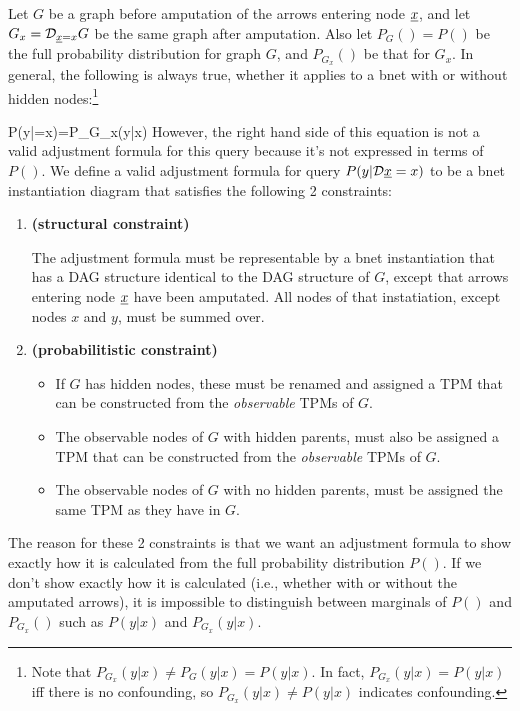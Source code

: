Let $G$ be a graph before
amputation
of the arrows entering node $\rvx$,
and let $G_x=\cald_{\rvx=x}G$
be the same graph after amputation.
Also let $P_G()=P()$ be
the full probability distribution
for graph $G$, and $P_{G_x}()$
be that for $G_x$.
In general, the
following is always true,
whether it applies to a bnet
with or without hidden nodes:\footnote{Note that $P_{G_x}(y|x)\neq P_G(y|x)=P(y|x)$.
In fact,
$P_{G_x}(y|x)= P(y|x)$
iff there is no confounding,
so $P_{G_x}(y|x)\neq P(y|x)$
indicates confounding.
}

\beq
P(y|\cald\rvx=x)=P_{G_x}(y|x)
\;
\eeq
However, the right hand side of this equation is
not a valid adjustment formula
for this query
because it's not expressed in terms
of $P()$.
We define a valid adjustment formula
for query
$P(y|\cald\rvx=x)$
to be a bnet instantiation diagram
that satisfies the
following 2 constraints:

\begin{enumerate}
\item {\bf(structural constraint)}

The adjustment formula must be
representable by a bnet instantiation
that has a DAG structure identical
to the DAG structure of $G$,
except that arrows entering node
$\rvx$ have been amputated.
All nodes  of that instatiation, except
nodes  $x$ and $y$,
must be summed over.

\item {\bf (probabilitistic constraint)}

\begin{itemize}
\item If $G$ has hidden nodes,
these must be renamed and
assigned a TPM that
can be constructed
from the {\it observable }
TPMs of $G$.
\item The observable
nodes of $G$
with hidden
parents, must also be assigned a TPM that
can be constructed
from the {\it observable }
TPMs of $G$.
\item The observable
nodes of $G$ with no hidden
parents, must be assigned
the same TPM as they have in $G$.
\end{itemize}
\end{enumerate}
The reason for
these 2 constraints
is that we want
an adjustment
formula to show
exactly how it is calculated from
the full probability distribution
$P()$.
If we don't show exactly
how it is calculated
(i.e., whether with or without
the amputated arrows),
it is impossible to distinguish
between marginals of $P()$ and $P_{G_x}()$
such as $P(y|x)$ and $P_{G_x}(y|x)$.



